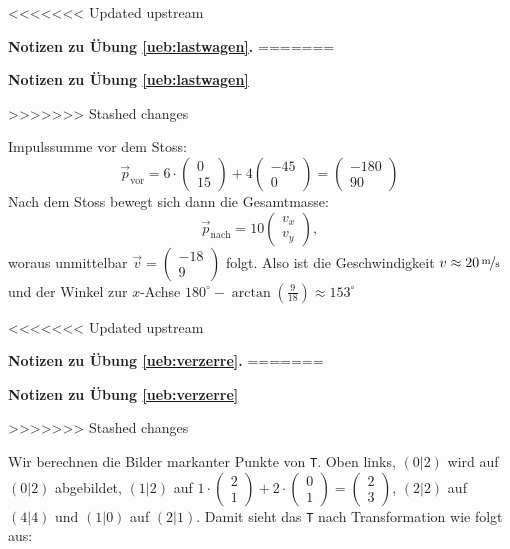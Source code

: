 \documentclass[%
11pt,%
twoside,%
titlepage,%
<<<<<<< Updated upstream
german,%
=======
swissgerman,%
>>>>>>> Stashed changes
headsepline%
]{scrartcl}
\newcommand{\faReturnGray}{\textcolor{gray}{\faMailReply}} %
\theoremstyle{definition}
\theoremstyle{plain}
\newcommand{\concatueb}[1]{ueb:#1}%
\newcommand{\concatlsg}[1]{lsg:#1}%
\newenvironment{lsg}[1]{%
<<<<<<< Updated upstream
    \par\noindent\textbf{Notizen zu Übung \ref{\concatueb{#1}}.}%
    \label{\concatlsg{#1}}
=======
    \par\noindent\textbf{Notizen zu Übung \ref{\concatueb{#1}}}\label{\concatlsg{#1}}
    \hfill\hyperref[\concatueb{#1}]{\faReturnGray}\par %
>>>>>>> Stashed changes
}{%
    \par%
}
\begin{document}
\begin{lsg}{lastwagen}
    Impulssumme vor dem Stoss:
    $$\vec{p}_{\text{vor}}=6\cdot\begin{pmatrix}
        0\\15
    \end{pmatrix}+4\begin{pmatrix}
        -45\\0
    \end{pmatrix}=\begin{pmatrix}
        -180\\90
    \end{pmatrix}$$
    Nach dem Stoss bewegt sich dann die Gesamtmasse:
    $$\vec{p}_{\text{nach}}=10\begin{pmatrix}
        v_x\\ v_y
    \end{pmatrix},$$
    woraus unmittelbar $\vec{v}=\begin{pmatrix}
        -18\\9
    \end{pmatrix}$ folgt. Also ist die Geschwindigkeit $v\approx\unitfrac[20]{m}{s}$ und der Winkel zur $x$-Achse $180^\circ-\arctan(\frac{9}{18})\approx153^\circ$
\end{lsg}
\begin{lsg}{verzerre}
    Wir berechnen die Bilder markanter Punkte von \texttt{T}. Oben links, $(0|2)$ wird auf $(0|2)$ abgebildet, $(1|2)$ auf $1\cdot\begin{pmatrix}
        2\\1
    \end{pmatrix}+2\cdot\begin{pmatrix}
        0\\1
    \end{pmatrix}=\begin{pmatrix}
        2\\3
    \end{pmatrix}$, $(2|2)$ auf $(4|4)$ und $(1|0)$ auf $(2|1)$. Damit sieht das \texttt{T} nach Transformation wie folgt aus:

    \begin{center}
\end{center}
\end{lsg}
\end{document}
